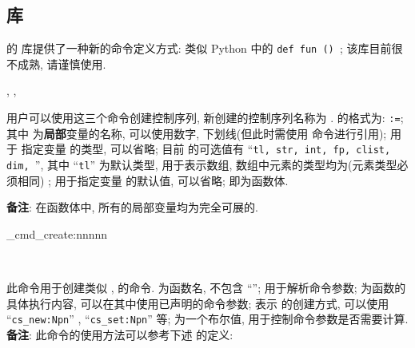 \clearpage
\subsection*{ 库}
\ztex{} 的  库提供了一种新的命令定义方式: 类似 Python 中的 
\texttt{def fun () }; 该库目前很不成熟, 请谨慎使用.


\begin{function}[added=2025-06-19, updated=2025-09-30]{\znewcmd, \zsetcmd, \zgsetcmd}
  \begin{syntax}
  \end{syntax}
  用户可以使用这三个命令创建控制序列, 新创建的控制序列名称为 .  的格式为: \texttt{:=};
  其中  为\textbf{局部}变量的名称, 可以使用数字, 下划线(但此时需使用  命令进行引用);  用于
  指定变量  的类型, 可以省略; 目前  的可选值有 ``\texttt{tl, str, int, fp, clist, dim, }'',  
  其中 ``\texttt{tl}'' 为默认类型, \texttt{} 用于表示数组, 数组中元素的类型均为(元素类型必须相同) ;  
  用于指定变量  的默认值, 可以省略;  即为函数体. \par
  \textbf{备注}: 在函数体中, 所有的局部变量均为完全可展的.
\end{function}



\begin{function}[added=2025-09-30]{\ztex_cmd_create:nnnnn}
  \begin{syntax}
    ~~~~
    ~~~~
  \end{syntax}
  此命令用于创建类似 \cmd{\znewcmd}, \cmd{\zsetcmd} 的命令.  为函数名, 不包含 ``\texttt{}'';
   用于解析命令参数;  为函数的具体执行内容, 可以在其中使用已声明的命令参数; 
  表示  的创建方式, 可以使用 ``\texttt{cs_new:Npn}'' , ``\texttt{cs_set:Npn}'' 等; 
  为一个布尔值, 用于控制命令参数是否需要计算. \textbf{备注}: 此命令的使用方法可以参考下述 \cmd{\znewcmd} 的定义:
\end{function}



